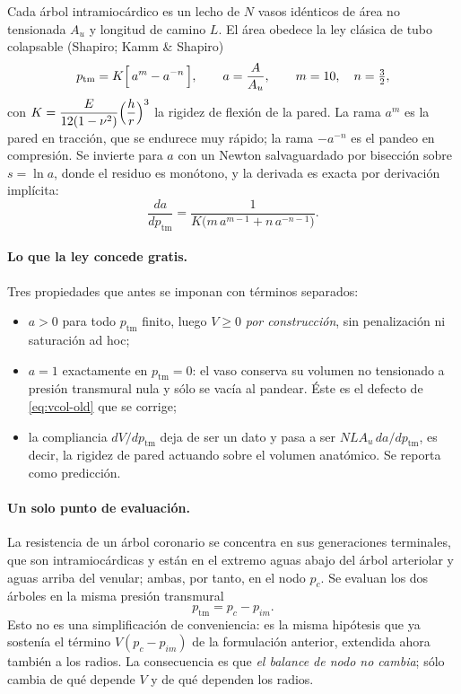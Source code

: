 \documentclass[11pt]{article}
\newcommand{\ptm}{p_{\mathrm{tm}}}
\begin{document}
Cada \'arbol intramioc\'ardico es un lecho de $N$ vasos id\'enticos de
\'area no tensionada $A_u$ y longitud de camino $L$. El \'area obedece la ley
cl\'asica de tubo colapsable (Shapiro; Kamm \& Shapiro)
\begin{equation}
  \ptm = K\Bigl[\,a^{m}-a^{-n}\,\Bigr],
  \qquad a=\frac{A}{A_u},
  \qquad m=10,\quad n=\tfrac32 ,
  \label{eq:tubo}
\end{equation}
con $K=\dfrac{E}{12(1-\nu^{2})}\Bigl(\dfrac{h}{r}\Bigr)^{3}$ la rigidez de
flexi\'on de la pared. La rama $a^{m}$ es la pared en tracci\'on, que se
endurece muy r\'apido; la rama $-a^{-n}$ es el pandeo en compresi\'on. Se
invierte para $a$ con un Newton salvaguardado por bisecci\'on sobre $s=\ln a$,
donde el residuo es mon\'otono, y la derivada es exacta por derivaci\'on
impl\'icita:
\begin{equation}
  \frac{da}{d\ptm}=\frac{1}{K\bigl(m\,a^{m-1}+n\,a^{-n-1}\bigr)} .
  \label{eq:dadp}
\end{equation}

\paragraph{Lo que la ley concede gratis.} Tres propiedades que antes se
imponan con t\'erminos separados:
\begin{itemize}
\item $a>0$ para todo $\ptm$ finito, luego $V\ge0$ \emph{por construcci\'on},
      sin penalizaci\'on ni saturaci\'on ad hoc;
\item $a=1$ exactamente en $\ptm=0$: el vaso conserva su volumen no
      tensionado a presi\'on transmural nula y s\'olo se vac\'ia al pandear.
      \'Este es el defecto de \eqref{eq:vcol-old} que se corrige;
\item la compliancia $dV/d\ptm$ deja de ser un dato y pasa a ser
      $N L A_u\,da/d\ptm$, es decir, la rigidez de pared actuando sobre el
      volumen anat\'omico. Se reporta como predicci\'on.
\end{itemize}

\paragraph{Un solo punto de evaluaci\'on.} La resistencia de un \'arbol
coronario se concentra en sus generaciones terminales, que son intramioc\'ardicas
y est\'an en el extremo aguas abajo del \'arbol arteriolar y aguas arriba del
venular; ambas, por tanto, en el nodo $p_c$. Se evaluan los dos \'arboles en la
misma presi\'on transmural
\begin{equation}
  \ptm = p_c-p_{im} .
  \label{eq:ptm}
\end{equation}
Esto no es una simplificaci\'on de conveniencia: es la misma hip\'otesis que ya
sosten\'ia el t\'ermino $V(p_c-p_{im})$ de la formulaci\'on anterior, extendida
ahora tambi\'en a los radios. La consecuencia es que \emph{el balance de nodo no
cambia}; s\'olo cambia de qu\'e depende $V$ y de qu\'e dependen los radios.
\end{document}
